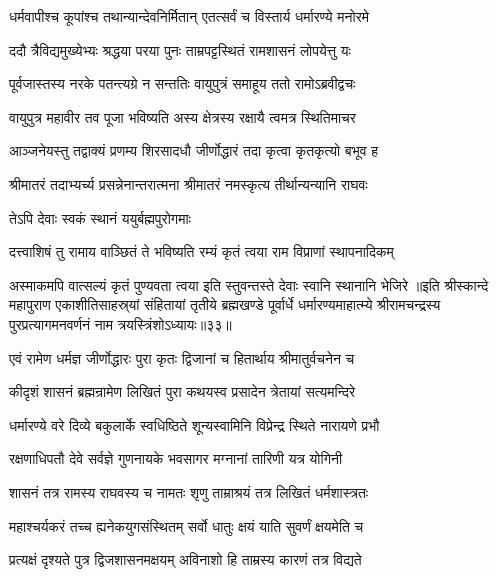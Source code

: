 \twolineshloka
{धर्मवापीश्च कूपांश्च तथान्यान्देवनिर्मितान्}
{एतत्सर्वं च विस्तार्य धर्मारण्ये मनोरमे}%

\twolineshloka
{ददौ त्रैविद्यमुख्येभ्यः श्रद्धया परया पुनः}
{ताम्रपट्टस्थितं रामशासनं लोपयेत्तु यः}%

\twolineshloka
{पूर्वजास्तस्य नरके पतन्त्यग्रे न सन्ततिः}
{वायुपुत्रं समाहूय ततो रामोऽब्रवीद्वचः}%

\twolineshloka
{वायुपुत्र महावीर तव पूजा भविष्यति}
{अस्य क्षेत्रस्य रक्षायै त्वमत्र स्थितिमाचर}%

\twolineshloka
{आञ्जनेयस्तु तद्वाक्यं प्रणम्य शिरसादधौ}
{जीर्णोद्धारं तदा कृत्वा कृतकृत्यो बभूव ह}%

\twolineshloka
{श्रीमातरं तदाभ्यर्च्य प्रसन्नेनान्तरात्मना}
{श्रीमातरं नमस्कृत्य तीर्थान्यन्यानि राघवः}%

\onelineshloka
{तेऽपि देवाः स्वकं स्थानं ययुर्बह्मपुरोगमाः}%

\twolineshloka
{दत्त्वाशिषं तु रामाय वाञ्छितं ते भविष्यति}
{रम्यं कृतं त्वया राम विप्राणां स्थापनादिकम्}%

\twolineshloka
{अस्माकमपि वात्सल्यं कृतं पुण्यवता त्वया}
{इति स्तुवन्तस्ते देवाः स्वानि स्थानानि भेजिरे}%
॥इति श्रीस्कान्दे महापुराण एकाशीतिसाहस्र्यां संहितायां तृतीये ब्रह्मखण्डे पूर्वार्धे धर्मारण्यमाहात्म्ये श्रीरामचन्द्रस्य पुरप्रत्यागमनवर्णनं नाम त्रयस्त्रिंशोऽध्यायः॥३३॥


\twolineshloka
{एवं रामेण धर्मज्ञ जीर्णोद्धारः पुरा कृतः}
{द्विजानां च हितार्थाय श्रीमातुर्वचनेन च}%


\twolineshloka
{कीदृशं शासनं ब्रह्मन्रामेण लिखितं पुरा}
{कथयस्व प्रसादेन त्रेतायां सत्यमन्दिरे}%


\twolineshloka
{धर्मारण्ये वरे दिव्ये बकुलार्के स्वधिष्ठिते}
{शून्यस्वामिनि विप्रेन्द्र स्थिते नारायणे प्रभौ}%

\twolineshloka
{रक्षणाधिपतौ देवे सर्वज्ञे गुणनायके}
{भवसागर मग्नानां तारिणी यत्र योगिनी}%

\twolineshloka
{शासनं तत्र रामस्य राघवस्य च नामतः}
{शृणु ताम्राश्रयं तत्र लिखितं धर्मशास्त्रतः}%

\twolineshloka
{महाश्चर्यकरं तच्च ह्यनेकयुगसंस्थितम्}
{सर्वो धातुः क्षयं याति सुवर्णं क्षयमेति च}%

\twolineshloka
{प्रत्यक्षं दृश्यते पुत्र द्विजशासनमक्षयम्}
{अविनाशो हि ताम्रस्य कारणं तत्र विद्यते}%

